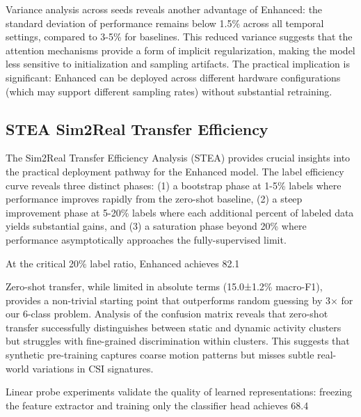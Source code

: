 \documentclass[journal]{IEEEtran}
\begin{document}
Variance analysis across seeds reveals another advantage of Enhanced: the standard deviation of performance remains below 1.5\% across all temporal settings, compared to 3-5\% for baselines. This reduced variance suggests that the attention mechanisms provide a form of implicit regularization, making the model less sensitive to initialization and sampling artifacts. The practical implication is significant: Enhanced can be deployed across different hardware configurations (which may support different sampling rates) without substantial retraining.

\subsection{STEA Sim2Real Transfer Efficiency}
The Sim2Real Transfer Efficiency Analysis (STEA) provides crucial insights into the practical deployment pathway for the Enhanced model. The label efficiency curve reveals three distinct phases: (1) a bootstrap phase at 1-5\% labels where performance improves rapidly from the zero-shot baseline, (2) a steep improvement phase at 5-20\% labels where each additional percent of labeled data yields substantial gains, and (3) a saturation phase beyond 20\% where performance asymptotically approaches the fully-supervised limit.

At the critical 20\% label ratio, Enhanced achieves 82.1%

Zero-shot transfer, while limited in absolute terms (15.0±1.2\% macro-F1), provides a non-trivial starting point that outperforms random guessing by 3× for our 6-class problem. Analysis of the confusion matrix reveals that zero-shot transfer successfully distinguishes between static and dynamic activity clusters but struggles with fine-grained discrimination within clusters. This suggests that synthetic pre-training captures coarse motion patterns but misses subtle real-world variations in CSI signatures.

Linear probe experiments validate the quality of learned representations: freezing the feature extractor and training only the classifier head achieves 68.4%
\end{document}
